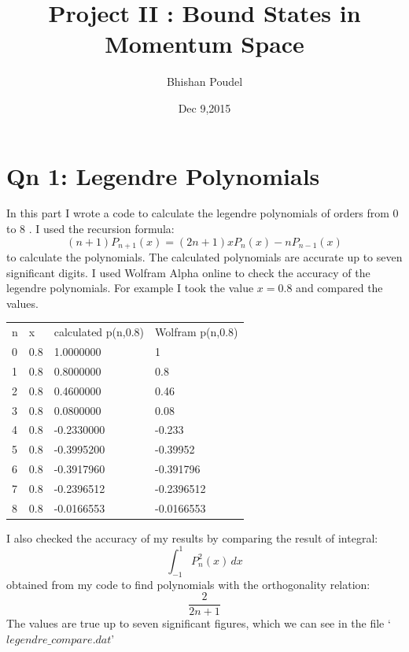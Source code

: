 \documentclass[11pt,a4paper,english]{article}
\title{Project II : Bound States in Momentum Space}
\author{Bhishan Poudel}
\date{Dec 9,2015}
\begin{document}
\maketitle
\tableofcontents
\listoffigures
\clearpage


\section{Qn 1: Legendre Polynomials }
In this part I wrote a code to calculate the legendre polynomials of orders from
$0$ to $8$ . I used the recursion formula:\\
\begin{equation}
(n+1) P_{n+1}(x) = (2n+1) x P_n(x) - nP_{n-1}(x)
\end{equation}
 to calculate the polynomials.
The calculated polynomials are accurate up to seven significant digits.
I used Wolfram Alpha online to check the accuracy of the legendre polynomials.
For example I took the value $x=0.8$ and compared the values.
\begin{center}
	\begin{tabular}{llll}
		 n&x  & calculated p(n,0.8)  & Wolfram p(n,0.8) \\
		 0&0.8  &1.0000000  &1  \\
		 1&0.8  &0.8000000  &0.8  \\
		 2&0.8  &0.4600000  &0.46  \\
		 3&0.8  &0.0800000  &0.08  \\
		 4&0.8  &-0.2330000  &-0.233  \\
		 5&0.8  &-0.3995200  &-0.39952  \\
		 6&0.8  &-0.3917960  &-0.391796  \\
		 7&0.8  &-0.2396512  &-0.2396512  \\
		 8&0.8  &-0.0166553  &-0.0166553  \\
	\end{tabular}
	\label{tab:}
\end{center}
I also checked the accuracy of my results by comparing the result of integral:\\
\begin{equation}
\int_{-1}^{1} \!\! P_{n}^2(x)\,dx
\end{equation}
obtained from my code to find polynomials with the orthogonality relation:\\
\begin{equation}
\frac{2}{2n+1} 
\end{equation}
The values are true up to seven significant figures, which we can see in the file 
`$legendre\_compare.dat$'
\end{document}
